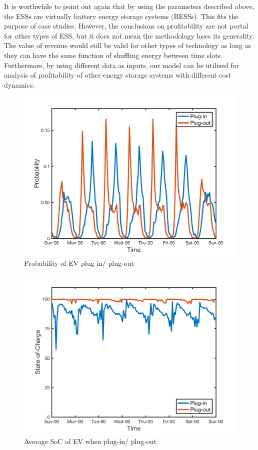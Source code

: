 It is worthwhile to point out again that by using the parameters described above, the ESSs are virtually battery energy storage systems (BESSs). This fits the purpose of case studies. However, the conclusions on profitability are not portal for other types of ESS, but it does not mean the methodology loses its generality. The value of revenue would still be valid for other types of technology as long as they can have the same function of shuffling energy between time slots. Furthermore, by using different data as inputs, our model can be utilized for analysis of profitability of other energy storage systems with different cost dynamics. 

\begin{figure}[h!]
	\centering
	\centering
	\includegraphics[width=0.8\linewidth]{Figures/Data_EV_number}
	\caption{Probability of EV plug-in/ plug-out}
	\label{fig:data-ev-number}
\end{figure}

\begin{figure}[h!]
	\centering
	\includegraphics[width=0.8\linewidth]{Figures/Data_SoC}
	\caption{Average SoC of EV when plug-in/ plug-out}
	\label{fig:data-soc}
\end{figure}

